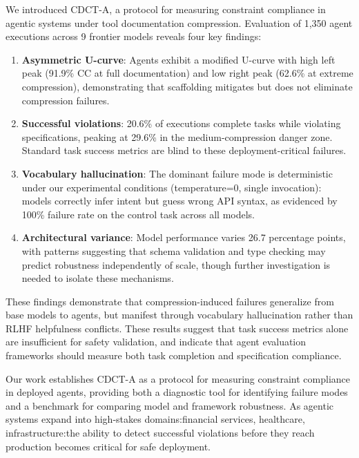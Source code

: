 \documentclass[11pt]{article}
\begin{document}
We introduced CDCT-A, a protocol for measuring constraint compliance in agentic systems under tool documentation compression. Evaluation of 1,350 agent executions across 9 frontier models reveals four key findings:

\begin{enumerate}
\item \textbf{Asymmetric U-curve}: Agents exhibit a modified U-curve with high left peak (91.9\% CC at full documentation) and low right peak (62.6\% at extreme compression), demonstrating that scaffolding mitigates but does not eliminate compression failures.

\item \textbf{Successful violations}: 20.6\% of executions complete tasks while violating specifications, peaking at 29.6\% in the medium-compression danger zone. Standard task success metrics are blind to these deployment-critical failures.

\item \textbf{Vocabulary hallucination}: The dominant failure mode is deterministic under our experimental conditions (temperature=0, single invocation): models correctly infer intent but guess wrong API syntax, as evidenced by 100\% failure rate on the control task across all models.

\item \textbf{Architectural variance}: Model performance varies 26.7 percentage points, with patterns suggesting that schema validation and type checking may predict robustness independently of scale, though further investigation is needed to isolate these mechanisms.
\end{enumerate}

These findings demonstrate that compression-induced failures generalize from base models to agents, but manifest through vocabulary hallucination rather than RLHF helpfulness conflicts. These results suggest that task success metrics alone are insufficient for safety validation, and indicate that agent evaluation frameworks should measure both task completion and specification compliance.

Our work establishes CDCT-A as a protocol for measuring constraint compliance in deployed agents, providing both a diagnostic tool for identifying failure modes and a benchmark for comparing model and framework robustness. As agentic systems expand into high-stakes domains:financial services, healthcare, infrastructure:the ability to detect successful violations before they reach production becomes critical for safe deployment.
\end{document}
